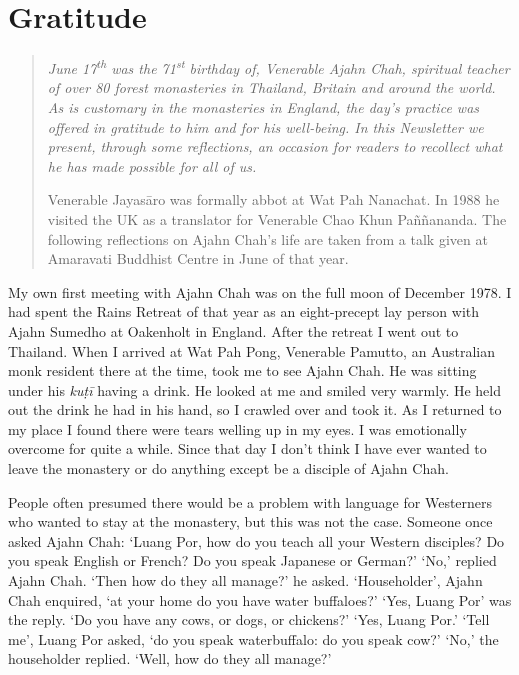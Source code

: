 
\chapter[Gratitude to Ajahn Chah]{Gratitude\newline {}}

\begin{quote}\itshape
June 17\textsuperscript{th} was the 71\textsuperscript{st} birthday of, Venerable Ajahn Chah, spiritual
teacher of over 80 forest monasteries in Thailand, Britain and around
the world. As is customary in the monasteries in England, the day's
practice was offered in gratitude to him and for his well-being. In this
Newsletter we present, through some reflections, an occasion for readers
to recollect what he has made possible for all of us.

Venerable Jayasāro was formally abbot at Wat Pah
Nanachat. In 1988 he visited the UK as a translator for Venerable Chao
Khun Paññananda. The following reflections on Ajahn Chah's life are
taken from a talk given at Amaravati Buddhist Centre in June of that
year.
\end{quote}

\noindent
My own first meeting with Ajahn Chah was on the full moon of December
1978. I had spent the Rains Retreat of that year as an eight-precept lay
person with Ajahn Sumedho at Oakenholt in England. After the retreat I
went out to Thailand. When I arrived at Wat Pah Pong, Venerable Pamutto, 
an Australian monk resident there at the time, took me to see Ajahn
Chah. He was sitting under his \emph{kuṭī} having a drink. He looked at
me and smiled very warmly. He held out the drink he had in his hand, so
I crawled over and took it. As I returned to my place I found there were
tears welling up in my eyes. I was emotionally overcome for quite a
while. Since that day I don't think I have ever wanted to leave the
monastery or do anything except be a disciple of Ajahn Chah. 

People often presumed there would be a problem with language for
Westerners who wanted to stay at the monastery, but this was not the
case. Someone once asked Ajahn Chah: `Luang Por, how do you teach all
your Western disciples? Do you speak English or French? Do you speak
Japanese or German?' `No,' replied Ajahn Chah. `Then how do they all
manage?' he asked. `Householder', Ajahn Chah enquired, `at your home do
you have water buffaloes?' `Yes, Luang Por' was the reply. `Do you have
any cows, or dogs, or chickens?' `Yes, Luang Por.' `Tell me', Luang Por
asked, `do you speak waterbuffalo: do you speak cow?' `No,' the
householder replied. `Well, how do they all manage?'

